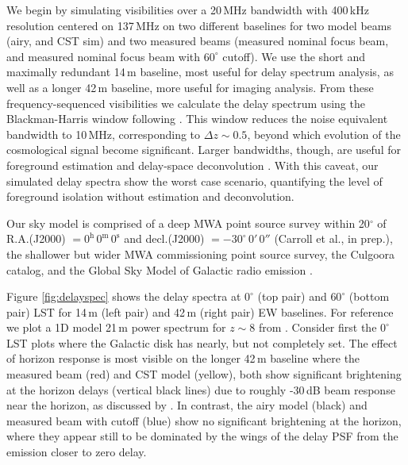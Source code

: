\documentclass{emulateapj}
\begin{document}
We begin by simulating visibilities over a 20\,MHz bandwidth with  400\,kHz resolution centered on 137\,MHz on two different baselines for two model beams (airy, and CST sim) and two measured beams (measured nominal focus beam, and measured nominal focus beam with $60^\circ$ cutoff). We use the short and maximally redundant 14\,m baseline, most useful for delay spectrum analysis, as well as a longer 42\,m baseline, more useful for imaging analysis. From these frequency-sequenced visibilities we calculate the delay spectrum  \citep{perbaselinetechnique} using the Blackman-Harris window following \citet{nithya15}. This window reduces the noise equivalent bandwidth to 10\,MHz, corresponding to $\Delta z\sim0.5$, beyond which evolution of the cosmological signal become significant. Larger bandwidths, though, are useful for foreground estimation and delay-space deconvolution \citep{parsonsandbacker,paper32,paper64}. With this caveat, our simulated delay spectra show the worst case scenario, quantifying the level of foreground isolation without estimation and deconvolution.

Our sky model is comprised of a deep MWA point source survey within 20$^\circ$ of R.A.(J2000) $= 0^\text{h}\,0^\text{m}\,0^\text{s}$ and decl.(J2000) $= -30^\circ\,0'\,0''$ (Carroll et al., in prep.), the shallower but wider MWA commissioning point source survey\citep{MWACS}, the Culgoora catalog\citep{Slee1995}, and the Global Sky Model of Galactic radio emission \citep{gsm}. 

Figure \ref{fig:delayspec} shows the delay spectra at $0^\circ$ (top pair) and $60^\circ$ (bottom pair) LST for 14\,m (left pair) and 42\,m (right pair) EW baselines. For reference we plot a 1D model 21\,m power spectrum for $z\sim8$ from \citet{21cmfast}. Consider first the $0^\circ$ LST plots where the Galactic disk has nearly, but not completely set. The effect of horizon response is most visible on the longer 42\,m baseline where the measured beam (red) and CST model (yellow), both show significant brightening at the horizon delays (vertical black lines) due to roughly -30\,dB beam response near the horizon, as discussed by \citet{nithya15,nithya15}. In contrast, the airy model (black) and measured beam with cutoff (blue) show no significant brightening at the horizon, where they appear still to be dominated by the wings of the delay PSF from the emission closer to zero delay. 
\end{document}
